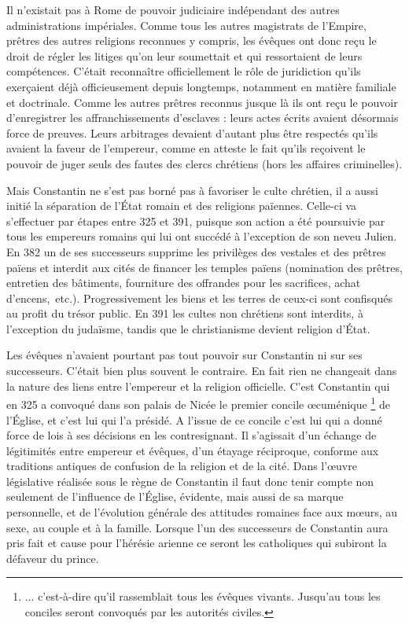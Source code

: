  Il n'existait pas à Rome de pouvoir judiciaire indépendant des autres administrations impériales. Comme tous les autres magistrats de l'Empire, prêtres des autres religions reconnues y compris, les évêques ont donc reçu le droit de régler les litiges qu'on leur soumettait et qui ressortaient de leurs compétences. C'était reconnaître officiellement le rôle de juridiction qu'ils exerçaient déjà officieusement depuis longtemps, notamment en matière familiale et doctrinale. Comme les autres prêtres reconnus jusque là ils ont reçu le pouvoir d'enregistrer les affranchissements d'esclaves : leurs actes écrits avaient désormais force de preuves. Leurs arbitrages devaient d'autant plus être respectés qu'ils avaient la faveur de l'empereur, comme en atteste le fait qu'ils reçoivent le pouvoir de juger seuls des fautes des clercs chrétiens (hors les affaires criminelles).

 Mais Constantin ne s'est pas borné pas à favoriser le culte chrétien, il a aussi initié la séparation de l'État romain et des religions païennes. Celle-ci va s'effectuer par étapes entre 325 et 391, puisque son action a été poursuivie par tous les empereurs romains qui lui ont succédé à l'exception de son neveu Julien. En 382 un de ses successeurs supprime les privilèges des vestales et des prêtres païens et interdit aux cités de financer les temples païens (nomination des prêtres, entretien des bâtiments, fourniture des offrandes pour les sacrifices, achat d'encens,~etc.). Progressivement les biens et les terres de ceux-ci sont confisqués au profit du trésor public. En 391 les cultes non chrétiens sont interdits, à l'exception du judaïsme, tandis que le christianisme devient religion d'État. 

 Les évêques n'avaient pourtant pas tout pouvoir sur Constantin ni sur ses successeurs. C'était bien plus souvent le contraire. En fait rien ne changeait dans la nature des liens entre l'empereur et la religion officielle. C'est Constantin qui en 325 a convoqué dans son palais de Nicée le premier concile œcuménique%
\footnote{... c'est-à-dire qu'il rassemblait tous les évêques vivants. Jusqu'au  tous les conciles seront convoqués par les autorités civiles.} 
de l'Église, et c'est lui qui l'a présidé. A l'issue de ce concile c'est lui qui a donné force de lois à ses décisions en les contresignant. Il s'agissait d'un échange de légitimités entre empereur et évêques, d'un étayage réciproque, conforme aux traditions antiques de confusion de la religion et de la cité. Dans l'œuvre législative réalisée sous le règne de Constantin il faut donc tenir compte non seulement de l'influence de l'Église, évidente, mais aussi de sa marque personnelle, et de l'évolution générale des attitudes romaines face aux mœurs, au sexe, au couple et à la famille. Lorsque l'un des successeurs de Constantin aura pris fait et cause pour l'hérésie arienne ce seront les catholiques qui subiront la défaveur du prince.

